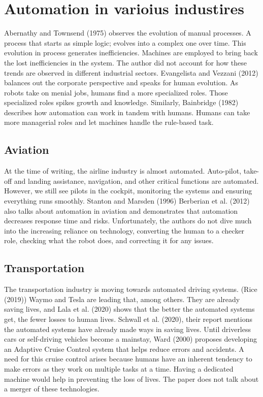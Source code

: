 \documentclass[
  man,floatsintext]{apa7}
\begin{document}
\hypertarget{automation-in-varioius-industires}{%
\section{Automation in varioius industires}\label{automation-in-varioius-industires}}

Abernathy and Townsend (1975) observes the evolution of manual processes. A process that starts as simple logic; evolves into a complex one over time. This evolution in process generates inefficiencies. Machines are employed to bring back the lost inefficiencies in the system. The author did not account for how these trends are observed in different industrial sectors. Evangelista and Vezzani (2012) balances out the corporate perspective and speaks for human evolution. As robots take on menial jobs, humans find a more specialized roles. Those specialized roles spikes growth and knowledge. Similarly, Bainbridge (1982) describes how automation can work in tandem with humans. Humans can take more managerial roles and let machines handle the rule-based task.

\hypertarget{aviation}{%
\subsection{Aviation}\label{aviation}}

At the time of writing, the airline industry is almost automated. Auto-pilot, take-off and landing assistance, navigation, and other critical functions are automated. However, we still see pilots in the cockpit, monitoring the systems and ensuring everything runs smoothly. Stanton and Marsden (1996) Berberian et al. (2012) also talks about automation in aviation and demonstrates that automation decreases response time and risks. Unfortunately, the authors do not dive much into the increasing reliance on technology, converting the human to a checker role, checking what the robot does, and correcting it for any issues.

\hypertarget{transportation}{%
\subsection{Transportation}\label{transportation}}

The transportation industry is moving towards automated driving systems. (Rice (2019)) Waymo and Tesla are leading that, among others. They are already saving lives, and Lala et al. (2020) shows that the better the automated systems get, the fewer losses to human lives. Schwall et al. (2020), their report mentions the automated systems have already made ways in saving lives. Until driverless cars or self-driving vehicles become a mainstay, Ward (2000) proposes developing an Adaptive Cruise Control system that helps reduce errors and accidents. A need for this cruise control arises because humans have an inherent tendency to make errors as they work on multiple tasks at a time. Having a dedicated machine would help in preventing the loss of lives. The paper does not talk about a merger of these technologies.
\end{document}
